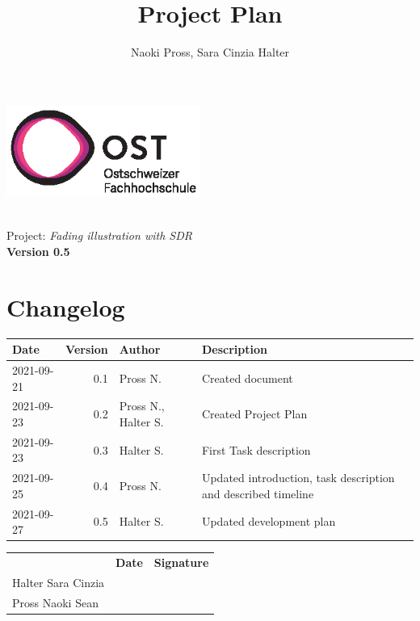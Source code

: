 \documentclass[a4paper, twosided, 11pt]{scrartcl}
\title{Project Plan}
\author{Naoki Pross, Sara Cinzia Halter}
\begin{document}
\begin{titlepage}
	\includegraphics[height=3cm]{fig/ost-logo}
	\begin{flushright}
		\vspace{5cm}
		{\Huge \bfseries \thetitle} \\
		\vspace{5mm}
		{\LARGE Project: \textit{Fading illustration with SDR}} \\
		\vspace{5mm}
		{\LARGE \bfseries Version 0.5}
	\end{flushright}
\end{titlepage}

\section*{Changelog}
\begin{tabularx}{\textwidth}{lrlX}
	\toprule
	\bfseries Date & \bfseries Version & \bfseries Author & \bfseries Description \\
	\midrule
	2021-09-21 & 0.1 & Pross N.            & Created document       \\
	2021-09-23 & 0.2 & Pross N., Halter S. & Created Project Plan   \\
	2021-09-23 & 0.3 & Halter S.           & First Task description \\
	2021-09-25 & 0.4 & Pross N.            &
		Updated introduction, task description and described timeline \\
	2021-09-27 & 0.5 & Halter S.           & Updated development plan \\
	\bottomrule
\end{tabularx}

\vfill
{
	\renewcommand{\arraystretch}{2}
	\begin{tabularx}{\textwidth}{lp{}X}
		                   & \bfseries Date & \bfseries Signature\\
		Halter Sara Cinzia & \hrulefill & \hrulefill \\
		Pross Naoki Sean   & \hrulefill & \hrulefill \\
	\end{tabularx}
}
\end{document}

